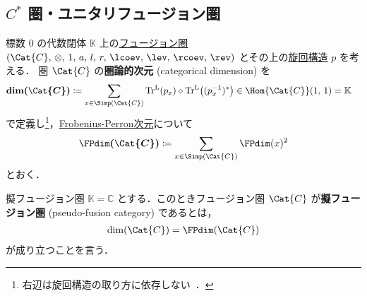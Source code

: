 \documentclass[TQFT_main]{subfiles}
\begin{document}
\subsection{$C^*$ 圏・ユニタリフュージョン圏}

標数 $0$ の代数閉体 $\mathbb{K}$ 上の\hyperref[def:tensorfusion-cat]{フュージョン圏} $(\Cat{C},\, \otimes,\, 1,\, a,\, l,\, r,\, \lcoev,\, \lev,\, \rcoev,\, \rev)$ とその上の\hyperref[def:pivotal]{旋回構造} $p$ を考える．
圏 $\Cat{C}$ の\textbf{圏論的次元} (categorical dimension) を
\begin{align}
    \label{def:categorialTr}
    \bm{\dim (\Cat{C})} &\coloneqq \sum_{x \in \Simp(\Cat{C})} \Tr^{\mathrm{L}} (p_x) \circ \Tr^{\mathrm{L}} \bigl( (p_x^{-1})^* \bigr) \in \Hom{\Cat{C}}(1,\, 1) = \mathbb{K}
\end{align}
で定義し\footnote{右辺は旋回構造の取り方に依存しない~\cite[p.179]{etingof2015tensor}．}，\hyperref[def:FPdim]{Frobenius-Perron次元}について
\begin{align}
    \bm{\FPdim (\Cat{C})} \coloneqq \sum_{x \in \Simp(\Cat{C})} \FPdim (x)^2
\end{align}
とおく．

\begin{mydef}[label=def:pseudo-unitary]{擬フュージョン圏}
    $\mathbb{K} = \mathbb{C}$ とする．このときフュージョン圏 $\Cat{C}$ が\textbf{擬フュージョン圏} (pseudo-fusion category) であるとは，
    \begin{align}
        \dim (\Cat{C}) = \FPdim (\Cat{C})
    \end{align}
    が成り立つことを言う．
\end{mydef}
\end{document}
